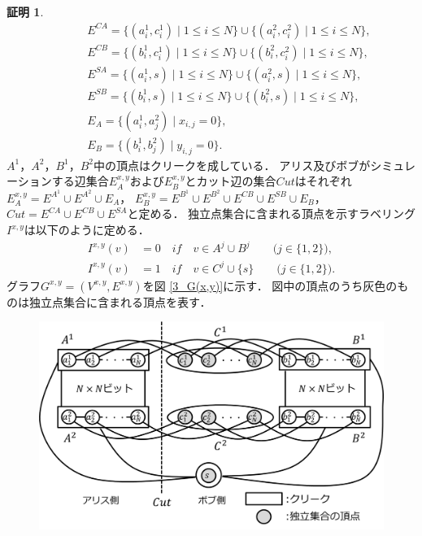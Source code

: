 \documentclass[12pt]{thesis}
\theoremstyle{definition}
\newtheorem*{prf*}{証明}
\begin{document}
\begin{prf*}
\begin{align*}
&\phantom{=} \quad E^{CA} = \{(a^{1}_{i}, c^{1}_{i}) \mid 1\leq i \leq N\} \cup \{(a^{2}_{i}, c^{2}_{i}) \mid 1\leq i \leq N\}, \\
&\phantom{=} \quad E^{CB} = \{(b^{1}_{i}, c^{1}_{i}) \mid 1\leq i \leq N\} \cup \{(b^{2}_{i}, c^{2}_{i}) \mid 1\leq i \leq N\}, \\
&\phantom{=} \quad E^{SA} = \{(a^{1}_{i}, s) \mid 1\leq i \leq N\} \cup \{(a^{2}_{i}, s) \mid 1\leq i \leq N\}, \\
&\phantom{=} \quad E^{SB} = \{(b^{1}_{i}, s) \mid 1\leq i \leq N\} \cup \{(b^{2}_{i}, s) \mid 1\leq i \leq N\}, \\
&\phantom{=} \quad E_{A} = \{(a^{1}_{i},a^{2}_{j}) \mid x_{i,j}=0\}, \\
&\phantom{=} \quad E_{B} = \{(b^{1}_{i},b^{2}_{j}) \mid y_{i,j}=0\}.
\end{align*}
$A^{1}$，$A^{2}$，$B^{1}$，$B^{2}$中の頂点はクリークを成している．
アリス及びボブがシミュレーションする辺集合$E^{x,y}_A$および$E^{x,y}_B$とカット辺の集合$\mathit{Cut}$はそれぞれ
$E^{x,y}_{A} = E^{A^{1}} \cup E^{A^{2}} \cup E_{A}$，
$E^{x,y}_{B} = E^{B^{1}} \cup E^{B^{2}} \cup E^{CB} \cup E^{SB} \cup E_{B}$，
$\mathit{Cut} = E^{CA} \cup E^{CB} \cup E^{SA}$と定める．
独立点集合に含まれる頂点を示すラベリング$I^{x,y}$は以下のように定める．
\begin{align*}
I^{x,y}(v) &= 0 \quad if \quad v \in A^{j} \cup B^{j} \quad \quad \text{($j \in \{1, 2\}$)}, \\
I^{x,y}(v) &= 1 \quad if \quad v \in C^{j} \cup \{s\} \quad \quad \text{($j \in \{1, 2\}$)}.
\end{align*}
グラフ$G^{x, y} = (V^{x,y}, E^{x,y})$を図 \ref{3_G(x,y)}に示す．
図中の頂点のうち灰色のものは独立点集合に含まれる頂点を表す．
\begin{figure}[ht]
\begin{center}
\includegraphics[width=120mm]{3_Gxy.png}

\end{center}
\end{figure}
\end{prf*}
\end{document}
